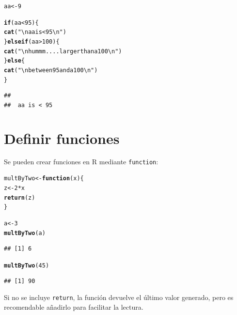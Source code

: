 \documentclass{config/apuntes}\usepackage[]{graphicx}\usepackage[]{xcolor}
\makeatletter
\newcommand{\hlnum}[1]{\textcolor[rgb]{0.686,0.059,0.569}{#1}}%
\newcommand{\hlsng}[1]{\textcolor[rgb]{0.192,0.494,0.8}{#1}}%
\newcommand{\hlopt}[1]{\textcolor[rgb]{0,0,0}{#1}}%
\newcommand{\hldef}[1]{\textcolor[rgb]{0.345,0.345,0.345}{#1}}%
\newcommand{\hlkwa}[1]{\textcolor[rgb]{0.161,0.373,0.58}{\textbf{#1}}}%
\newcommand{\hlkwb}[1]{\textcolor[rgb]{0.69,0.353,0.396}{#1}}%
\newcommand{\hlkwc}[1]{\textcolor[rgb]{0.333,0.667,0.333}{#1}}%
\newcommand{\hlkwd}[1]{\textcolor[rgb]{0.737,0.353,0.396}{\textbf{#1}}}%
\newenvironment{kframe}{%
 \def\at@end@of@kframe{}%
 \ifinner\ifhmode%
  \def\at@end@of@kframe{\end{minipage}}%
  \begin{minipage}{\columnwidth}%
 \fi\fi%
 \def\FrameCommand##1{\hskip\@totalleftmargin \hskip-\fboxsep
 \colorbox{shadecolor}{##1}\hskip-\fboxsep
     \hskip-\linewidth \hskip-\@totalleftmargin \hskip\columnwidth}%
 \MakeFramed {\advance\hsize-\width
   \@totalleftmargin\z@ \linewidth\hsize
   \@setminipage}}%
 {\par\unskip\endMakeFramed%
 \at@end@of@kframe}
\newenvironment{knitrout}{}{} %
\newcommand{\code}[1]{\texttt{#1}}
\makeatother
\begin{document}
\begin{knitrout}
\color{fgcolor}\begin{kframe}
\begin{alltt}
\hldef{aa} \hlkwb{<-} \hlnum{9}

\hlkwa{if} \hldef{(aa} \hlopt{<} \hlnum{95}\hldef{) \{}
  \hlkwd{cat}\hldef{(}\hlsng{"\textbackslash{}n aa is < 95\textbackslash{}n"}\hldef{)}
\hldef{\}} \hlkwa{else if} \hldef{(aa} \hlopt{>} \hlnum{100}\hldef{) \{}
  \hlkwd{cat}\hldef{(}\hlsng{"\textbackslash{}n hummm.... larger than a 100\textbackslash{}n"}\hldef{)}
\hldef{\}} \hlkwa{else} \hldef{\{}
  \hlkwd{cat}\hldef{(}\hlsng{"\textbackslash{}n between 95 and a 100\textbackslash{}n"}\hldef{)}
\hldef{\}}
\end{alltt}
\begin{verbatim}
## 
##  aa is < 95
\end{verbatim}
\end{kframe}
\end{knitrout}

\section{Definir funciones}
Se pueden crear funciones en R mediante \code{function}:

\begin{knitrout}
\color{fgcolor}\begin{kframe}
\begin{alltt}
\hldef{multByTwo} \hlkwb{<-} \hlkwa{function}\hldef{(}\hlkwc{x}\hldef{) \{}
  \hldef{z} \hlkwb{<-} \hlnum{2} \hlopt{*} \hldef{x}
  \hlkwd{return}\hldef{(z)}
\hldef{\}}

\hldef{a} \hlkwb{<-} \hlnum{3}
\hlkwd{multByTwo}\hldef{(a)}
\end{alltt}
\begin{verbatim}
## [1] 6
\end{verbatim}
\begin{alltt}
\hlkwd{multByTwo}\hldef{(}\hlnum{45}\hldef{)}
\end{alltt}
\begin{verbatim}
## [1] 90
\end{verbatim}
\end{kframe}
\end{knitrout}

Si no se incluye \code{return}, la función devuelve el último valor generado, pero es recomendable añadirlo para facilitar la lectura. 
\end{document}
